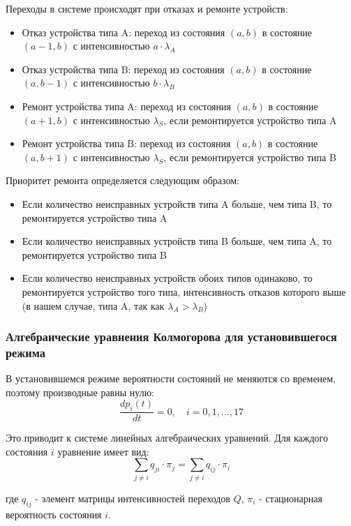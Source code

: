 Переходы в системе происходят при отказах и ремонте устройств:
\begin{itemize}
    \item Отказ устройства типа A: переход из состояния $(a, b)$ в состояние $(a-1, b)$ с интенсивностью $a \cdot \lambda_A$
    \item Отказ устройства типа B: переход из состояния $(a, b)$ в состояние $(a, b-1)$ с интенсивностью $b \cdot \lambda_B$
    \item Ремонт устройства типа A: переход из состояния $(a, b)$ в состояние $(a+1, b)$ с интенсивностью $\lambda_S$, если ремонтируется устройство типа A
    \item Ремонт устройства типа B: переход из состояния $(a, b)$ в состояние $(a, b+1)$ с интенсивностью $\lambda_S$, если ремонтируется устройство типа B
\end{itemize}

Приоритет ремонта определяется следующим образом:
\begin{itemize}
    \item Если количество неисправных устройств типа A больше, чем типа B, то ремонтируется устройство типа A
    \item Если количество неисправных устройств типа B больше, чем типа A, то ремонтируется устройство типа B
    \item Если количество неисправных устройств обоих типов одинаково, то ремонтируется устройство того типа, интенсивность отказов которого выше (в нашем случае, типа A, так как $\lambda_A > \lambda_B$)
\end{itemize}

\subsubsection{Алгебраические уравнения Колмогорова для установившегося режима}

В установившемся режиме вероятности состояний не меняются со временем, поэтому производные равны нулю:
\begin{equation}
\frac{dp_i(t)}{dt} = 0, \quad i = 0, 1, \ldots, 17
\end{equation}

Это приводит к системе линейных алгебраических уравнений. Для каждого состояния $i$ уравнение имеет вид:
\begin{equation}
\sum_{j \neq i} q_{ji} \cdot \pi_j = \sum_{j \neq i} q_{ij} \cdot \pi_i
\end{equation}

где $q_{ij}$ - элемент матрицы интенсивностей переходов $Q$, $\pi_i$ - стационарная вероятность состояния $i$.

